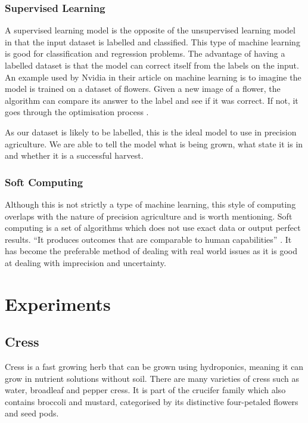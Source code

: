 \subsubsection{Supervised Learning}

A supervised learning model is the opposite of the unsupervised learning model in that the input dataset is labelled and classified. This type of machine learning is good for classification and regression problems. The advantage of having a labelled dataset is that the model can correct itself from the labels on the input. An example used by Nvidia in their article \cite{machineLearningNvidia} on machine learning is to imagine the model is trained on a dataset of flowers. Given a new image of a flower, the algorithm can compare its answer to the label and see if it was correct. If not, it goes through the optimisation process \cite{machineLearningIBM}.

As our dataset is likely to be labelled, this is the ideal model to use in precision agriculture. We are able to tell the model what is being grown, what state it is in and whether it is a successful harvest.

\subsubsection{Soft Computing}

Although this is not strictly a type of machine learning, this style of computing overlaps with the nature of precision agriculture and is worth mentioning. Soft computing is a set of algorithms which does not use exact data or output perfect results. “It produces outcomes that are comparable to human capabilities” \cite{supervisedPrecisionAgriculturePhasinam}. It has become the preferable method of dealing with real world issues as it is good at dealing with imprecision and uncertainty. 


\section{Experiments}

\subsection{Cress}

Cress is a fast growing herb that can be grown using hydroponics, meaning it can grow in nutrient solutions without soil. There are many varieties of cress such as water, broadleaf and pepper cress. It is part of the crucifer family which also contains broccoli and mustard, categorised by its distinctive four-petaled flowers and seed pods.


